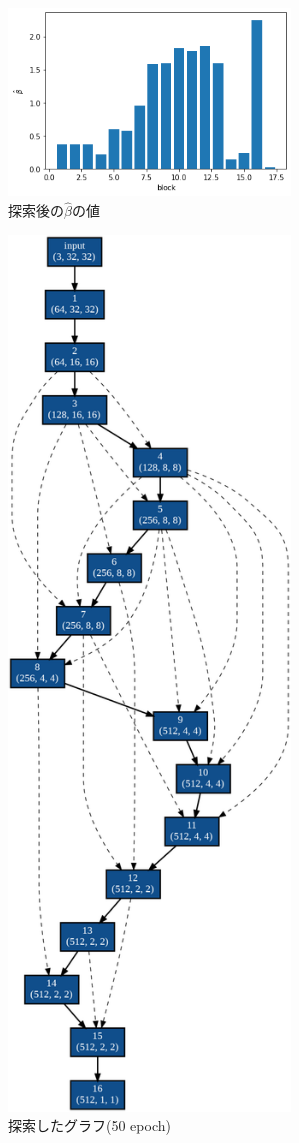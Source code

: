 \documentclass[twocolumn]{jarticle}     %
\begin{document}
\begin{figure}[tb]
	\begin{center}
		\includegraphics[clip,width=75mm]{beta.png}
		\caption{探索後の$\hat{\beta}$の値}
		\label{fig:beta}
	\end{center}
\end{figure}

\begin{figure}[tb]
	\begin{center}
		\includegraphics[clip,width=75mm]{graph_50.png}
		\caption{探索したグラフ(50 epoch)}
		\label{fig:search}
	\end{center}
\end{figure}
\end{document}
